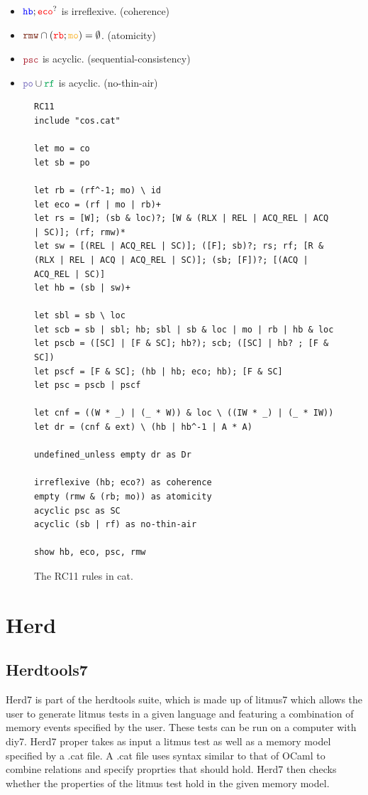 \documentclass[a4,11pt]{article}
\newcommand{\hb}{\texttt{\color{blue}hb}}
\newcommand{\eco}{\texttt{\color{red}eco}}
\newcommand{\rmw}{\texttt{\color{Brown}rmw}}
\newcommand{\rb}{\texttt{\color{red}rb}}
\newcommand{\mo}{\texttt{\color{Dandelion}mo}}
\newcommand{\psc}{\texttt{\color{Maroon}psc}}
\newcommand{\po}{\texttt{\color{Periwinkle}po}}
\newcommand{\rf}{\texttt{\color{Green}rf}}
\begin{document}
\begin{itemize}
\item $\hb ; \eco ^?$ is irreflexive. \hfill (coherence)
\item $\rmw \cap (\rb ; \mo) = \emptyset$. \hfill (atomicity)
\item $\psc$ is acyclic. \hfill (sequential-consistency)
\item $\po \cup \rf$ is acyclic. \hfill (no-thin-air)
\end{itemize}


\begin{figure}
\centering
\begin{lstlisting}
RC11
include "cos.cat"

let mo = co
let sb = po

let rb = (rf^-1; mo) \ id
let eco = (rf | mo | rb)+
let rs = [W]; (sb & loc)?; [W & (RLX | REL | ACQ_REL | ACQ | SC)]; (rf; rmw)*
let sw = [(REL | ACQ_REL | SC)]; ([F]; sb)?; rs; rf; [R & (RLX | REL | ACQ | ACQ_REL | SC)]; (sb; [F])?; [(ACQ | ACQ_REL | SC)]
let hb = (sb | sw)+

let sbl = sb \ loc
let scb = sb | sbl; hb; sbl | sb & loc | mo | rb | hb & loc
let pscb = ([SC] | [F & SC]; hb?); scb; ([SC] | hb? ; [F & SC])
let pscf = [F & SC]; (hb | hb; eco; hb); [F & SC]
let psc = pscb | pscf

let cnf = ((W * _) | (_ * W)) & loc \ ((IW * _) | (_ * IW))
let dr = (cnf & ext) \ (hb | hb^-1 | A * A)

undefined_unless empty dr as Dr

irreflexive (hb; eco?) as coherence
empty (rmw & (rb; mo)) as atomicity
acyclic psc as SC
acyclic (sb | rf) as no-thin-air

show hb, eco, psc, rmw
\end{lstlisting}
\caption{The RC11 rules in cat.}
\label{fig:rc11-cat-code}
\end{figure}
\vfill
\section{Herd}

\subsection{Herdtools7}

Herd7 is part of the herdtools suite, which is made up of litmus7 which allows the user to generate litmus tests in a given language and featuring a combination of memory events specified by the user. These tests can be run on a computer with diy7. Herd7 proper takes as input a litmus test as well as a memory model specified by a .cat file. A .cat file uses syntax similar to that of OCaml to combine relations and specify proprties that should hold. Herd7 then checks whether the properties of the litmus test hold in the given memory model.
\end{document}
